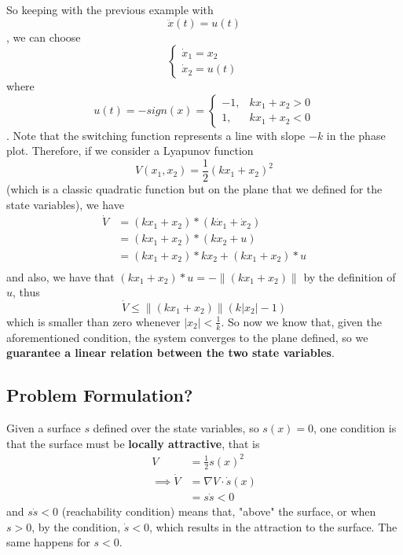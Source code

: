 So keeping with the previous example with \[
\ddot{x}(t) = u(t)
\] , we can choose \[
\begin{cases}
    \dot{x}_1 = x_2 \\
    \dot{x}_2 = u(t)
\end{cases}
\] where \[
u(t) = -sign(x) = \begin{cases}
    -1, & kx_1 + x_2 > 0 \\
    1, & kx_1+x_2 < 0
\end{cases}
\]. Note that the switching function represents a line with slope $-k$ in the phase plot. Therefore, if we consider a Lyapunov function  \[
V(x_1,x_2) = \frac{1}{2} \left( kx_1 + x_2 \right) ^{2}
\] (which is a classic quadratic function but on the plane that we defined for the state variables), we have
\begin{align*}
    \dot{V} &= \left( kx_1 + x_2 \right) * \left( k\dot{x}_1 + \dot{x}_2 \right) \\
	    &=  \left( kx_1 + x_2 \right) * \left( kx_2 + u \right) \\
	    &=  \left( kx_1 + x_2 \right) * kx_2 + \left( kx_1 + x_2 \right) * u \\
\end{align*}
and also, we have that $\left( kx_1 + x_2 \right) * u = - \|\left( kx_1 + x_2 \right)\|$ by the definition of $u$, thus  \[
    \dot{V} \le \|\left( kx_1 + x_2 \right)\|(k|x_2| - 1)
\] which is smaller than zero whenever $|x_2| < \frac{1}{k}$. So now we know that, given the aforementioned condition, the system converges to the plane defined, so we \textbf{guarantee a linear relation between the two state variables}.

\subsection*{Problem Formulation?}

Given a surface $s$ defined over the state variables, so $s(x) = 0$, one condition is that the surface must be \textbf{locally attractive}, that is
\begin{align*}
    V &= \frac{1}{2}s(x)^{2} \\
    \implies \dot{V} &=\nabla V \cdot \dot{s}(x) \\
		     &= s\dot{s} < 0
\end{align*}
and $s\dot{s}<0$ (reachability condition)  means that, "above" the surface, or when $s > 0$, by the condition, $\dot{s}<0$, which results in the attraction to the surface. The same happens for $s<0$. 

